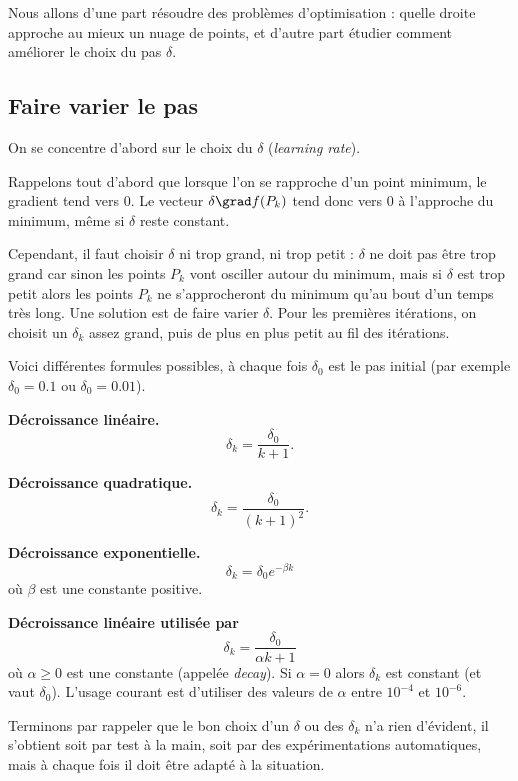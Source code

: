 \documentclass[10pt,class=report,crop=false]{standalone}
\begin{document}
Nous allons d'une part résoudre des problèmes d'optimisation : quelle droite approche au mieux un nuage de points, et d'autre part étudier comment améliorer le choix du pas $\delta$.


\subsection{Faire varier le pas}

On se concentre d'abord sur le choix du  $\delta$ (\emph{learning rate}).

Rappelons tout d'abord que lorsque l'on se rapproche d'un point minimum, le gradient tend vers $0$. Le vecteur $\delta \grad f(P_k)$ tend donc vers $0$ à l'approche du minimum, même si $\delta$ reste constant.

Cependant, il faut choisir $\delta$ ni trop grand, ni trop petit : $\delta$ ne doit pas être trop grand car sinon les points $P_k$ vont osciller autour du minimum, mais si $\delta$ est trop petit alors les points $P_k$ ne s'approcheront du minimum qu'au bout d'un temps très long. Une solution est de faire varier $\delta$. Pour les premières itérations, on choisit un $\delta_k$ assez grand, puis de plus en plus petit au fil des itérations.

Voici différentes formules possibles, à chaque fois $\delta_0$ est le pas initial (par exemple $\delta_0=0.1$ ou $\delta_0=0.01$).

\textbf{Décroissance linéaire.}
$$\delta_k = \frac{\delta_0}{k+1}.$$

\textbf{Décroissance quadratique.}
$$\delta_k = \frac{\delta_0}{(k+1)^2}.$$

\textbf{Décroissance exponentielle.}
$$\delta_k = \delta_0 e^{-\beta k}$$
où $\beta$ est une constante positive.


\textbf{Décroissance linéaire utilisée par \keras}
$$\delta_k = \frac{\delta_0}{\alpha k+1}$$
où $\alpha\ge0$ est une constante (appelée \emph{decay}).
Si $\alpha=0$ alors $\delta_k$ est constant (et vaut $\delta_0$).
L'usage courant est d'utiliser des valeurs de $\alpha$ entre $10^{-4}$ et $10^{-6}$.


Terminons par rappeler que le bon choix d'un $\delta$ ou des $\delta_k$ n'a rien d'évident, il s'obtient soit par test à la main, soit par des expérimentations automatiques, mais à chaque fois il doit être adapté à la situation.
\end{document}
